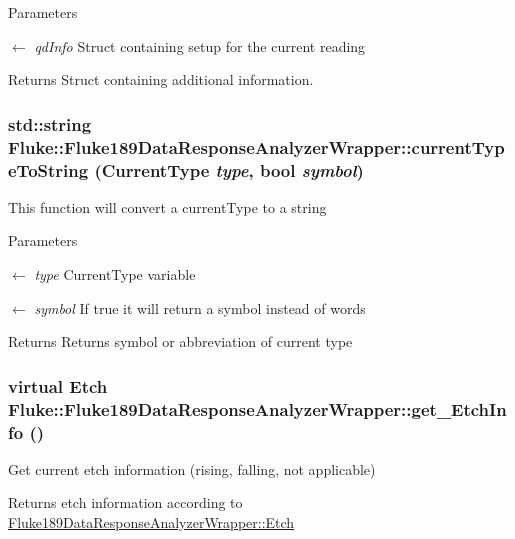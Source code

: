 \begin{DoxyParams}{Parameters}
\item[\mbox{$\leftarrow$} {\em qdInfo}]Struct containing setup for the current reading \end{DoxyParams}
\begin{DoxyReturn}{Returns}
Struct containing additional information. 
\end{DoxyReturn}
\hypertarget{classFluke_1_1Fluke189DataResponseAnalyzerWrapper_a17475d8977da4140a5e7fbe28e3fdb6e}{
\subsubsection[{currentTypeToString}]{\setlength{\rightskip}{0pt plus 5cm}std::string Fluke::Fluke189DataResponseAnalyzerWrapper::currentTypeToString ({\bf CurrentType} {\em type}, \/  bool {\em symbol})}}
\label{classFluke_1_1Fluke189DataResponseAnalyzerWrapper_a17475d8977da4140a5e7fbe28e3fdb6e}
This function will convert a currentType to a string 
\begin{DoxyParams}{Parameters}
\item[\mbox{$\leftarrow$} {\em type}]CurrentType variable \item[\mbox{$\leftarrow$} {\em symbol}]If true it will return a symbol instead of words \end{DoxyParams}
\begin{DoxyReturn}{Returns}
Returns symbol or abbreviation of current type 
\end{DoxyReturn}
\hypertarget{classFluke_1_1Fluke189DataResponseAnalyzerWrapper_a258e56c1ff27b8aae648940599d3b475}{
\subsubsection[{get\_\-EtchInfo}]{\setlength{\rightskip}{0pt plus 5cm}virtual {\bf Etch} Fluke::Fluke189DataResponseAnalyzerWrapper::get\_\-EtchInfo ()}}
\label{classFluke_1_1Fluke189DataResponseAnalyzerWrapper_a258e56c1ff27b8aae648940599d3b475}
Get current etch information (rising, falling, not applicable) \begin{DoxyReturn}{Returns}
etch information according to \hyperlink{classFluke_1_1Fluke189DataResponseAnalyzerWrapper_ada71f6ab32a7b0eb40bb0ed96d7053bc}{Fluke189DataResponseAnalyzerWrapper::Etch} 
\end{DoxyReturn}


